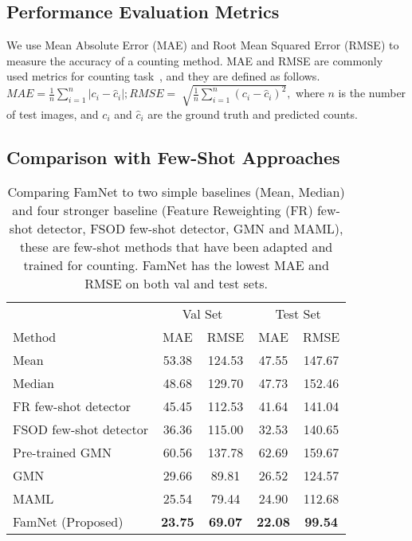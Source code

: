 \subsection{Performance Evaluation Metrics} 

We use Mean Absolute Error (MAE) and Root Mean Squared Error (RMSE) to measure the accuracy of a counting method. MAE and RMSE are commonly used metrics for counting task~\cite{zhang2016single,ma2019bayesian,ranjan2018iterative}, and they are defined as follows.
$MAE = \frac{1}{n}\sum_{i=1}^{n} \lvert c_i - \hat{c}_i \rvert; 
RMSE = \sqrt[]{\frac{1}{n}\sum_{i=1}^{n} (c_i - \hat{c}_i)^2}, 
$
where $n$ is the number of test images, and $c_i$ and $\hat{c}_i$ are the ground truth and predicted counts.

\subsection{Comparison with Few-Shot Approaches}
\setlength{\tabcolsep}{2pt}
\begin{table}[!tb]
\vskip 0.1in
\centering
\begin{tabular}{lcccc}
\toprule
          &  \multicolumn{2}{c}{ Val Set} &  \multicolumn{2}{c}{ Test Set} \\
         \cmidrule(lr){2-3} \cmidrule(lr){4-5} 
    Method &  MAE          & RMSE    & MAE          & RMSE         \\

\midrule 
Mean & 53.38 & 124.53 & 47.55 & 147.67 \\
Median & 48.68 & 129.70 & 47.73 & 152.46 \\
FR few-shot detector  \cite{kang2019few} & 45.45  & 112.53 & 41.64 & 141.04 \\
FSOD few-shot detector \cite{fan2020few} & 36.36 & 115.00 & 32.53  & 140.65 \\
Pre-trained GMN \cite{lu2018class} & 60.56 &  137.78 & 62.69 & 159.67 \\
GMN \cite{lu2018class} & 29.66 & 89.81 & 26.52 & 124.57  \\
MAML \cite{finn2017model} & 25.54 & 79.44 & 24.90  & 112.68 \\
FamNet (Proposed)   & \textbf{23.75} & \textbf{69.07} & \textbf{22.08} & \textbf{99.54}  \\
\bottomrule 
\end{tabular}
\vskip -0.1in
\caption{Comparing FamNet to two simple baselines (Mean, Median) and four stronger baseline (Feature Reweighting (FR) few-shot detector, FSOD few-shot detector, GMN and MAML), these are few-shot methods that have been adapted and trained for counting. FamNet has the lowest MAE and RMSE on both val and test sets.
\label{tab:baseline}}
\end{table}

